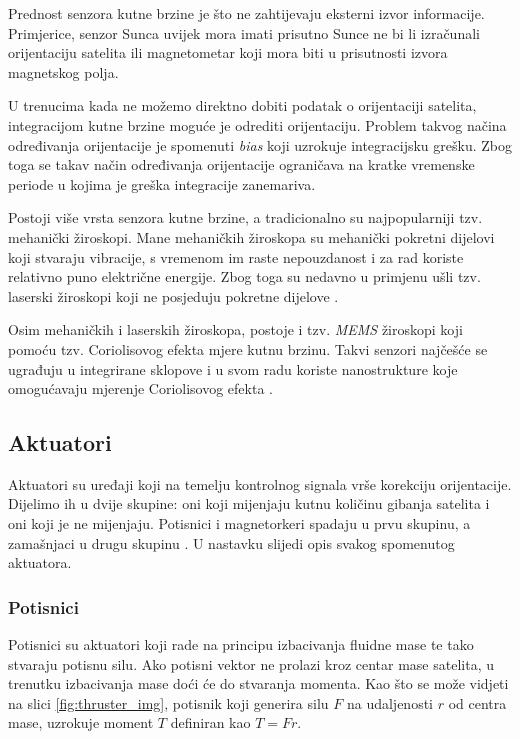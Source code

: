 \documentclass[times, utf8, diplomski, numeric]{templates/template}
\begin{document}
{{{            Prednost senzora kutne brzine je što ne zahtijevaju eksterni izvor informacije. Primjerice, senzor Sunca uvijek mora imati prisutno Sunce ne bi li izračunali orijentaciju satelita ili magnetometar koji mora biti u prisutnosti izvora magnetskog polja. 

            U trenucima kada ne možemo direktno dobiti podatak o orijentaciji satelita, integracijom kutne brzine moguće je odrediti orijentaciju. Problem takvog načina određivanja orijentacije je spomenuti \emph{bias} koji uzrokuje integracijsku grešku. Zbog toga se takav način određivanja orijentacije ograničava na kratke vremenske periode u kojima je greška integracije zanemariva.

            Postoji više vrsta senzora kutne brzine, a tradicionalno su najpopularniji tzv. mehanički žiroskopi. Mane mehaničkih žiroskopa su mehanički pokretni dijelovi koji stvaraju vibracije, s vremenom im raste nepouzdanost i za rad koriste relativno puno električne energije. Zbog toga su nedavno u primjenu ušli tzv. laserski žiroskopi koji ne posjeduju pokretne dijelove \cite{adcsKnjiga}. 

            Osim mehaničkih i laserskih žiroskopa, postoje i tzv. \emph{MEMS} žiroskopi koji pomoću tzv. Coriolisovog efekta mjere kutnu brzinu. Takvi senzori najčešće se ugrađuju u integrirane sklopove i u svom radu koriste nanostrukture koje omogućavaju mjerenje Coriolisovog efekta \cite{memsGyro}.
        }

        \subsection{Aktuatori}{
            Aktuatori su uređaji koji na temelju kontrolnog signala vrše korekciju orijentacije. Dijelimo ih u dvije skupine: oni koji mijenjaju kutnu količinu gibanja satelita i oni koji je ne mijenjaju. Potisnici i magnetorkeri spadaju u prvu skupinu, a zamašnjaci u drugu skupinu \cite{adcsKnjiga}. U nastavku slijedi opis svakog spomenutog aktuatora. 

            \subsubsection{Potisnici }{
                Potisnici su aktuatori koji rade na principu izbacivanja fluidne mase te tako stvaraju potisnu silu. Ako potisni vektor ne prolazi kroz centar mase satelita, u trenutku izbacivanja mase doći će do stvaranja momenta. Kao što se može vidjeti na slici \ref{fig:thruster_img}, potisnik koji generira silu $F$ na udaljenosti $r$ od centra mase, uzrokuje moment $T$ definiran kao $T=Fr$.

}}}}
\end{document}
